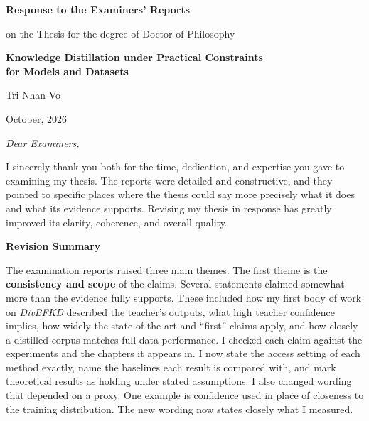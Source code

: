 \documentclass[12pt,a4paper]{article}
\newenvironment{foldable}{}{}
\newcommand{\authorname}{Tri Nhan Vo}
\newcommand{\degree}{Doctor of Philosophy}
\newcommand{\submissiondate}{October, 2026}
\begin{document}
\begin{center}
  {\LARGE\bfseries Response to the Examiners' Reports \par}
  \vspace{0.5cm}
  {on the Thesis for the degree of \degree \par}
  \vspace{0.3cm}
  {\Large \bfseries Knowledge Distillation under Practical Constraints \\ for Models and Datasets \par}
  \vspace{0.3cm}
  {\large \authorname \par}
  {\submissiondate \par}
  \vspace{0.3cm}
\end{center}

\vspace{\baselineskip}

\begin{foldable}
  \textit{Dear Examiners,}
\end{foldable}

\begin{foldable}
  I sincerely thank you both for the time, dedication, and expertise you gave to examining my thesis.
  The reports were detailed and constructive, and they pointed to specific places where the thesis could say more precisely what it does and what its evidence supports.
  Revising my thesis in response has greatly improved its clarity, coherence, and overall quality.
\end{foldable}

\begin{foldable}
  \vspace{0.3cm}
  \textbf{\large Revision Summary}
\end{foldable}

\begin{foldable}
  The examination reports raised three main themes.
  The first theme is the \textbf{consistency and scope} of the claims.
  Several statements claimed somewhat more than the evidence fully supports.
  These included how my first body of work on \textit{DivBFKD} described the teacher's outputs, what high teacher confidence implies, how widely the state-of-the-art and ``first'' claims apply, and how closely a distilled corpus matches full-data performance.
  I checked each claim against the experiments and the chapters it appears in.
  I now state the access setting of each method exactly, name the baselines each result is compared with, and mark theoretical results as holding under stated assumptions.
  I also changed wording that depended on a proxy.
  One example is confidence used in place of closeness to the training distribution.
  The new wording now states closely what I measured.
\end{foldable}
\end{document}
